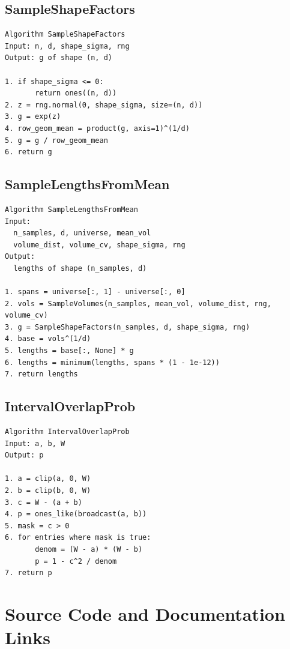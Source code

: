 \documentclass[11pt,a4paper]{article}
\begin{document}
\subsection{SampleShapeFactors}

\begin{verbatim}
Algorithm SampleShapeFactors
Input: n, d, shape_sigma, rng
Output: g of shape (n, d)

1. if shape_sigma <= 0:
       return ones((n, d))
2. z = rng.normal(0, shape_sigma, size=(n, d))
3. g = exp(z)
4. row_geom_mean = product(g, axis=1)^(1/d)
5. g = g / row_geom_mean
6. return g
\end{verbatim}

\subsection{SampleLengthsFromMean}

\begin{verbatim}
Algorithm SampleLengthsFromMean
Input:
  n_samples, d, universe, mean_vol
  volume_dist, volume_cv, shape_sigma, rng
Output:
  lengths of shape (n_samples, d)

1. spans = universe[:, 1] - universe[:, 0]
2. vols = SampleVolumes(n_samples, mean_vol, volume_dist, rng, volume_cv)
3. g = SampleShapeFactors(n_samples, d, shape_sigma, rng)
4. base = vols^(1/d)
5. lengths = base[:, None] * g
6. lengths = minimum(lengths, spans * (1 - 1e-12))
7. return lengths
\end{verbatim}

\subsection{IntervalOverlapProb}

\begin{verbatim}
Algorithm IntervalOverlapProb
Input: a, b, W
Output: p

1. a = clip(a, 0, W)
2. b = clip(b, 0, W)
3. c = W - (a + b)
4. p = ones_like(broadcast(a, b))
5. mask = c > 0
6. for entries where mask is true:
       denom = (W - a) * (W - b)
       p = 1 - c^2 / denom
7. return p
\end{verbatim}

\section{Source Code and Documentation Links}
\end{document}
